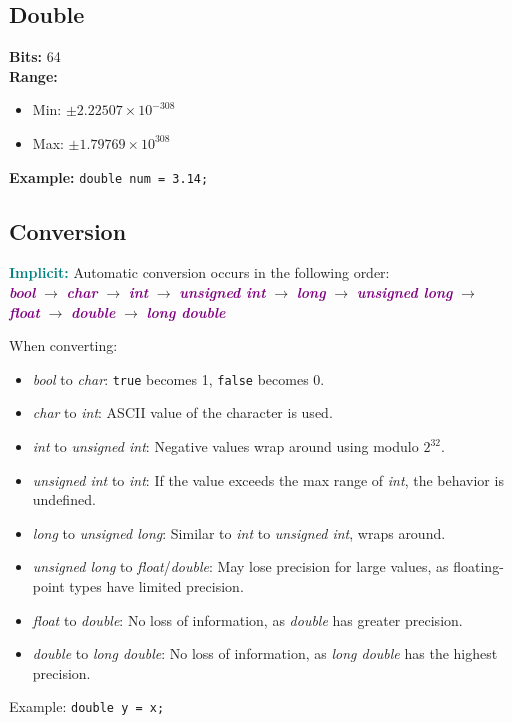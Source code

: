 \subsection{Double}
\textbf{Bits:} 64 \\
\textbf{Range:} 
\begin{itemize}
    \item Min: \( \pm 2.22507 \times 10^{-308} \)
    \item Max: \( \pm 1.79769 \times 10^{308} \)
\end{itemize}
\textbf{Example:} \lstinline[style=CodeExpert]{double num = 3.14;}



\subsection{Conversion}
\textbf{\textcolor{teal}{Implicit:}} Automatic conversion occurs in the following order: \\
\textbf{\textit{\textcolor{purple}{bool}}} $\rightarrow$ 
\textbf{\textit{\textcolor{purple}{char}}} $\rightarrow$ 
\textbf{\textit{\textcolor{purple}{int}}} $\rightarrow$ 
\textbf{\textit{\textcolor{purple}{unsigned int}}} $\rightarrow$ 
\textbf{\textit{\textcolor{purple}{long}}} $\rightarrow$ 
\textbf{\textit{\textcolor{purple}{unsigned long}}} $\rightarrow$ 
\textbf{\textit{\textcolor{purple}{float}}} $\rightarrow$ 
\textbf{\textit{\textcolor{purple}{double}}} $\rightarrow$ 
\textbf{\textit{\textcolor{purple}{long double}}}

When converting:
\begin{itemize}
    \item \textit{bool} to \textit{char}: \lstinline[style=CodeExpert]{true} becomes 1, \lstinline[style=CodeExpert]{false} becomes 0.
    \item \textit{char} to \textit{int}: ASCII value of the character is used.
    \item \textit{int} to \textit{unsigned int}: Negative values wrap around using modulo \( 2^{32} \).
    \item \textit{unsigned int} to \textit{int}: If the value exceeds the max range of \textit{int}, the behavior is undefined.
    \item \textit{long} to \textit{unsigned long}: Similar to \textit{int} to \textit{unsigned int}, wraps around.
    \item \textit{unsigned long} to \textit{float}/\textit{double}: May lose precision for large values, as floating-point types have limited precision.
    \item \textit{float} to \textit{double}: No loss of information, as \textit{double} has greater precision.
    \item \textit{double} to \textit{long double}: No loss of information, as \textit{long double} has the highest precision.
\end{itemize}
Example: \lstinline[style=CodeExpert]{double y = x;}

